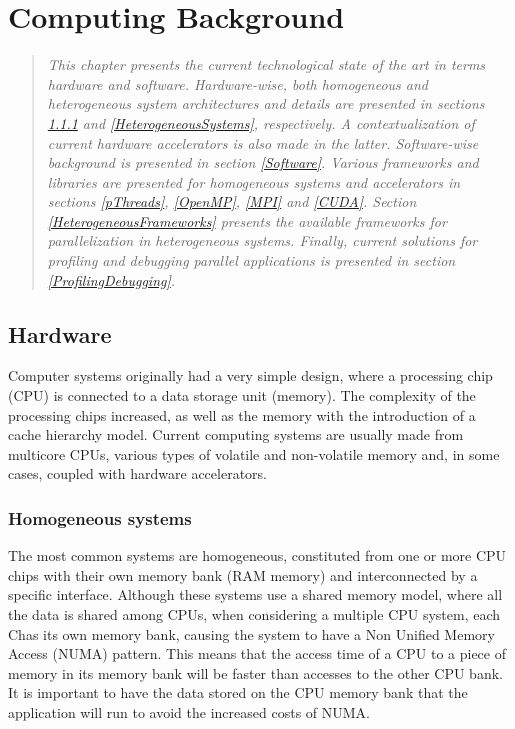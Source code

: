 \chapter{Computing Background}
\label{TechnologicalBackground}

\begin{quote}
\textit{This chapter presents the current technological state of the art in terms hardware and software. Hardware-wise, both homogeneous and heterogeneous system architectures and details are presented in sections \ref{HomogeneousSystems} and \ref{HeterogeneousSystems}, respectively. A contextualization of current hardware accelerators is also made in the latter. Software-wise background is presented in section \ref{Software}. Various frameworks and libraries are presented for homogeneous systems and accelerators in sections \ref{pThreads}, \ref{OpenMP}, \ref{MPI} and \ref{CUDA}. Section \ref{HeterogeneousFrameworks} presents the available frameworks for parallelization in heterogeneous systems. Finally, current solutions for profiling and debugging parallel applications is presented in section \ref{ProfilingDebugging}.}
\end{quote}

\section{Hardware}
\label{Hardware}

Computer systems originally had a very simple design, where a processing chip (CPU) is connected to a data storage unit (memory). The complexity of the processing chips increased, as well as the memory with the introduction of a cache hierarchy model. Current computing systems are usually made from multicore CPUs, various types of volatile and non-volatile memory and, in some cases, coupled with hardware accelerators.

\subsection{Homogeneous systems}
\label{HomogeneousSystems}

The most common systems are homogeneous, constituted from one or more CPU chips with their own memory bank (RAM memory) and interconnected by a specific interface. Although these systems use a shared memory model, where all the data is shared among CPUs, when considering a multiple CPU system, each Chas its own memory bank, causing the system to have a Non Unified Memory Access (NUMA) pattern. This means that the access time of a CPU to a piece of memory in its memory bank will be faster than accesses to the other CPU bank. It is important to have the data stored on the CPU memory bank that the application will run to avoid the increased costs of NUMA.

